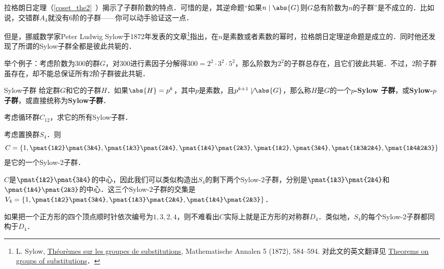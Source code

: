 


拉格朗日定理（\autoref{coset_the2}~）揭示了子群阶数的特点．可惜的是，其逆命题“如果$n\mid \abs{G}$则$G$总有阶数为$n$的子群”是不成立的．比如说，交错群$A_4$就没有$6$阶的子群——你可以动手验证这一点．

但是，挪威数学家Peter Ludwig Sylow于1872年发表的文章\footnote{L. Sylow, \href{https://eudml.org/doc/156588}{Théorèmes sur les groupes de substitutions}, Mathematische Annalen 5 (1872), 584–594. 对此文的英文翻译见 \href{http://www.maths.qmul.ac.uk/~raw/pubs_files/Sylow.pdf}{Theorems on groups of substitutions}．}指出，在$n$是素数或者素数的幂时，拉格朗日定理逆命题是成立的．同时他还发现了所谓的Sylow子群全都是彼此共轭的．

举个例子：考虑阶数为$300$的群$G$，对$300$进行素因子分解得$300=2^2\cdot 3^2\cdot 5^2$，那么阶数为$2^2$的子群总存在，且它们彼此共轭．不过，$2$阶子群虽存在，却不能总保证所有$2$阶子群彼此共轭．


\begin{definition}{Sylow子群}\label{Sylow_def1}
给定群$G$和它的子群$H$．如果$\abs{H}=p^k$，其中$p$是素数，且$p^{k+1}\not\mid\abs{G}$，那么称$H$是$G$的一个$p$\textbf{-Sylow 子群}，或\textbf{Sylow-}$p$\textbf{子群}，或直接统称为\textbf{Sylow子群}．
\end{definition}



\begin{exercise}{}
考虑循环群$C_{12}$，求它的所有Sylow子群．
\end{exercise}

\begin{example}{}
考虑置换群$S_4$．则
\begin{equation}
C=\{1, \pmat{1&2}\pmat{3&4}, \pmat{1&3}\pmat{2&4}, \pmat{1&4}\pmat{2&3}, \pmat{1&2}, \pmat{3&4}, \pmat{1&3&2&4}, \pmat{1&4&2&3}\}
\end{equation}
是它的一个Sylow-$2$子群．

$C$是$\pmat{1&2}\pmat{3&4}$的中心，因此我们可以类似构造出$S_4$的剩下两个Sylow-$2$子群，分别是$\pmat{1&3}\pmat{2&4}$和$\pmat{1&4}\pmat{2&3}$的中心．这三个Sylow-$2$子群的交集是$V_4=\{1, \pmat{1&2}\pmat{3&4}, \pmat{1&3}\pmat{2&4}, \pmat{1&4}\pmat{2&3}\}$．

如果把一个正方形的四个顶点顺时针依次编号为$1, 3, 2, 4$，则不难看出$C$实际上就是正方形的对称群$D_4$．类似地，$S_4$的每个Sylow-$2$子群都同构于$D_4$．

\end{example}


